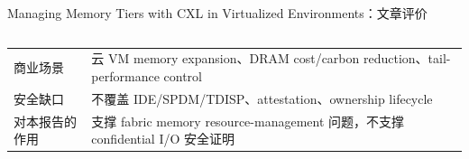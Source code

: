 \begin{frame}[t,shrink=6]{Managing Memory Tiers with CXL in Virtualized Environments：文章评价}
\begin{columns}[T,totalwidth=\textwidth]
\begin{column}{0.49\textwidth}
{\begin{minipage}[t]{0.97\linewidth}
\begin{minipage}{0.92\linewidth}
{\begin{tabularx}{\linewidth}{@{}YY@{}}
商业场景 & 云 VM memory expansion、DRAM cost/carbon reduction、tail-performance control \\
安全缺口 & 不覆盖 IDE/SPDM/TDISP、attestation、ownership lifecycle \\
对本报告的作用 & 支撑 fabric memory resource-management 问题，不支撑 confidential I/O 安全证明 \\
\bottomrule
\end{tabularx}
}
    \end{minipage}
    \vspace{1mm}
  \end{minipage}}
  \end{column}
\end{columns}
\end{frame}


